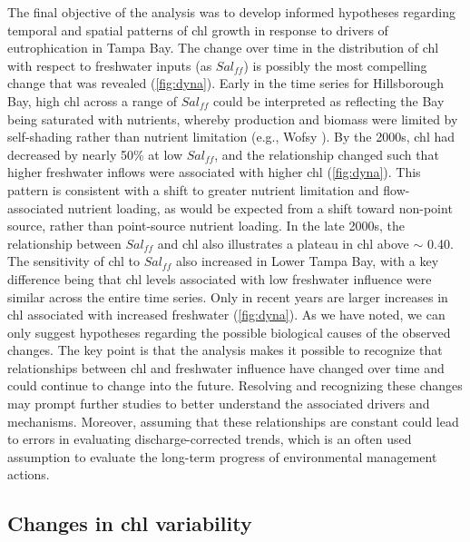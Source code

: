 \documentclass{svjour3}\usepackage[]{graphicx}\usepackage[]{color}
\begin{document}
The final objective of the analysis was to develop informed hypotheses regarding temporal and spatial patterns of \ac{chl} growth in response to drivers of eutrophication in Tampa Bay.  The change over time in the distribution of \ac{chl} with respect to freshwater inputs (as $Sal_{ff}$) is possibly the most compelling change that was revealed (\cref{fig:dyna}).  Early in the time series for Hillsborough Bay, high \ac{chl} across a range of $Sal_{ff}$ could be interpreted as reflecting the Bay being saturated with nutrients, whereby production and biomass were limited by self-shading rather than nutrient limitation (e.g., Wofsy \cite{Wofsy83}).  By the 2000s, \ac{chl} had decreased by nearly 50\% at low $Sal_{ff}$, and the relationship changed such that higher freshwater inflows were associated with higher \ac{chl} (\cref{fig:dyna}).  This pattern is consistent with a shift to greater nutrient limitation and flow-associated nutrient loading, as would be expected from a shift toward non-point source, rather than point-source nutrient loading.  In the late 2000s, the relationship between $Sal_{ff}$ and \ac{chl} also illustrates a plateau in \ac{chl} above $\sim$ 0.40.  The sensitivity of \ac{chl} to $Sal_{ff}$ also increased in Lower Tampa Bay, with a key difference being that \ac{chl} levels associated with low freshwater influence were similar across the entire time series.  Only in recent years are larger increases in \ac{chl} associated with increased freshwater (\cref{fig:dyna}).  As we have noted, we can only suggest hypotheses regarding the possible biological causes of the observed changes.  The key point is that the analysis makes it possible to recognize that relationships between \ac{chl} and freshwater influence have changed over time and could continue to change into the future.  Resolving and recognizing these changes may prompt further studies to better understand the associated drivers and mechanisms.  Moreover, assuming that these relationships are constant could lead to errors in evaluating discharge-corrected trends, which is an often used assumption to evaluate the long-term progress of environmental management actions.

\subsection{Changes in \ac{chl} variability}
\end{document}

